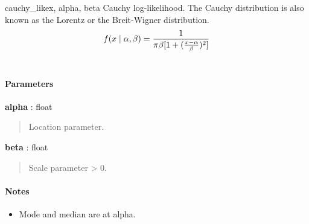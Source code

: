 \hypertarget{pymc.distributions.cauchy_like}{}
\begin{funcdesc}{cauchy\_like}{x, alpha, beta}
Cauchy log-likelihood. The Cauchy distribution is also known as the
Lorentz or the Breit-Wigner distribution.
\begin{gather}
\begin{split}f(x \mid \alpha, \beta) = \frac{1}{\pi \beta [1 + (\frac{x-\alpha}{\beta})^2]}\end{split}\notag\\\begin{split}\end{split}\notag
\end{gather}
\paragraph{Parameters}
\begin{paramlist}
\item[] \textbf{alpha} : float
\begin{quote}

Location parameter.
\end{quote}

\item[] \textbf{beta} : float
\begin{quote}

Scale parameter \textgreater{} 0.
\end{quote}
\end{paramlist}
\paragraph{Notes}
\begin{itemize}
\item {}
Mode and median are at alpha.

\end{itemize}
\end{funcdesc}


